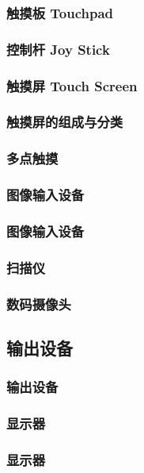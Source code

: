 \documentclass{beamer}
\begin{document}
\begin{frame}
	\frametitle{触摸板 Touchpad}

\end{frame}

\begin{frame}
	\frametitle{控制杆 Joy Stick}

\end{frame}

\begin{frame}
	\frametitle{触摸屏 Touch Screen}

\end{frame}

\begin{frame}
	\frametitle{触摸屏的组成与分类}

\end{frame}

\begin{frame}
	\frametitle{多点触摸}

\end{frame}

\subsubsection{图像输入设备}
\begin{frame}
	\frametitle{图像输入设备}

\end{frame}

\begin{frame}
	\frametitle{扫描仪}

\end{frame}

\begin{frame}
	\frametitle{数码摄像头}

\end{frame}

\subsection{输出设备}
\begin{frame}
	\frametitle{输出设备}

\end{frame}

\subsubsection{显示器}
\begin{frame}
	\frametitle{显示器}

\end{frame}
\end{document}
